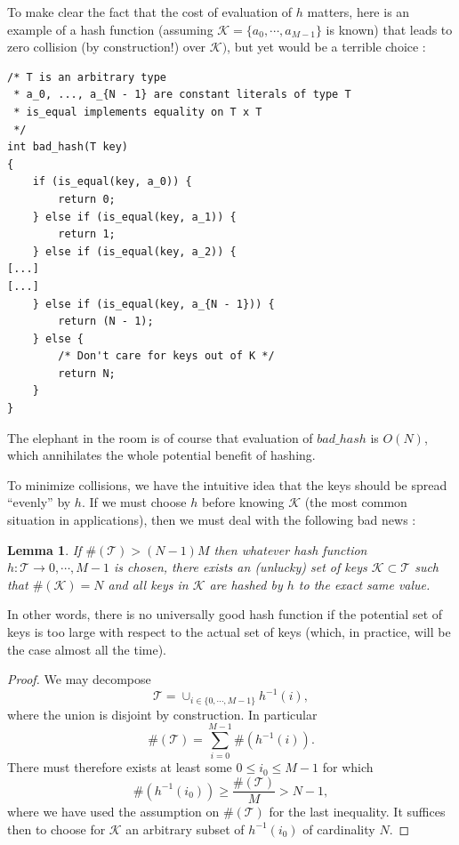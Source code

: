 \documentclass[12pt]{article}
\theoremstyle{plain}
\newtheorem{lemma}{Lemma}
\theoremstyle{remark}
\begin{document}
To make clear the fact that the cost of evaluation of $h$ matters, here is an example 
of a hash function (assuming $\mathcal{K} = \{a_0,\cdots, a_{M-1}\}$ is known) that 
leads to zero collision (by construction!) over $\mathcal{K})$, but yet would be
a terrible choice :

\begin{lstlisting}[style=C]
/* T is an arbitrary type
 * a_0, ..., a_{N - 1} are constant literals of type T
 * is_equal implements equality on T x T 
 */
int bad_hash(T key)
{
	if (is_equal(key, a_0)) {
		return 0;
	} else if (is_equal(key, a_1)) {
		return 1;
	} else if (is_equal(key, a_2)) {
[...]
[...]
	} else if (is_equal(key, a_{N - 1})) {
		return (N - 1);
	} else {
		/* Don't care for keys out of K */
		return N;
	}
}
\end{lstlisting}

The elephant in the room is of course that evaluation of $bad\_hash$ is $O(N)$,
which annihilates the whole potential benefit of hashing.

\medskip
To minimize collisions, we have the intuitive idea that the keys should be
spread ``evenly'' by $h$. If we must choose $h$ before knowing $\mathcal{K}$
(the most common situation in applications), then we must deal with the following
bad news :

\begin{lemma} If $\#(\mathcal{T}) > (N-1)M$ then whatever hash function $h
	:\mathcal{T} \to {0, \cdots, M-1}$ is chosen, there exists an (unlucky)
	set of keys $\mathcal{K} \subset \mathcal{T}$ such that $\#(\mathcal{K})
	= N$ and all keys in $\mathcal{K}$ are hashed by $h$ to the exact same
	value.
\end{lemma}

In other words, there is no universally good hash function if the potential set 
of keys is too large with respect to the actual set of keys (which, in practice, 
will be the case almost all the time).

\begin{proof}
We may decompose
$$
	\mathcal{T} = \cup_{i \in \{0,\cdots, M-1\}} h^{-1}(i),
$$
where the union is disjoint by construction. In particular
$$
	\#(\mathcal{T}) = \sum_{i=0}^{M-1} \#(h^{-1}(i)).
$$
There must therefore exists at least some $0 \leq i_0 \leq M-1$ for
which
$$
	\#(h^{-1}(i_0)) \geq \frac{\#(\mathcal{T})}{M} > N - 1,
$$
	where we have used the assumption on $\#(\mathcal{T})$ for the last
	inequality. It suffices then to choose for $\mathcal{K}$ an arbitrary
	subset of $h^{-1}(i_0)$ of cardinality $N$.
\end{proof}
\end{document}
